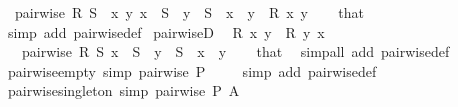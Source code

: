 \begin{isabellebody}
\ \ {\isachardoublequoteopen}pairwise\ R\ S{\isachardoublequoteclose}\ \ {\isachardoublequoteopen}{\isasymAnd}x\ y{\isachardot}{\kern0pt}\ x\ {\isasymin}\ S\ {\isasymLongrightarrow}\ y\ {\isasymin}\ S\ {\isasymLongrightarrow}\ x\ {\isasymnoteq}\ y\ {\isasymLongrightarrow}\ R\ x\ y{\isachardoublequoteclose}\isanewline
%
\isadelimproof
\ \ %
\endisadelimproof
%
\isatagproof
{}\isamarkupfalse%
\ that\ \isamarkupfalse%
\ {\isacharparenleft}{\kern0pt}simp\ add{\isacharcolon}{\kern0pt}\ pairwise{\isacharunderscore}{\kern0pt}def{\isacharparenright}{\kern0pt}%
\endisatagproof
{\isafoldproof}%
%
\isadelimproof
\isanewline
%
\endisadelimproof
\isanewline
{}\isamarkupfalse%
\ pairwiseD{\isacharcolon}{\kern0pt}\isanewline
\ \ {\isachardoublequoteopen}R\ x\ y{\isachardoublequoteclose}\ \ {\isachardoublequoteopen}R\ y\ x{\isachardoublequoteclose}\isanewline
\ \ \ {\isachardoublequoteopen}pairwise\ R\ S{\isachardoublequoteclose}\ {\isachardoublequoteopen}x\ {\isasymin}\ S{\isachardoublequoteclose}\ \ {\isachardoublequoteopen}y\ {\isasymin}\ S{\isachardoublequoteclose}\ \ {\isachardoublequoteopen}x\ {\isasymnoteq}\ y{\isachardoublequoteclose}\isanewline
%
\isadelimproof
\ \ %
\endisadelimproof
%
\isatagproof
{}\isamarkupfalse%
\ that\ \isamarkupfalse%
\ {\isacharparenleft}{\kern0pt}simp{\isacharunderscore}{\kern0pt}all\ add{\isacharcolon}{\kern0pt}\ pairwise{\isacharunderscore}{\kern0pt}def{\isacharparenright}{\kern0pt}%
\endisatagproof
{\isafoldproof}%
%
\isadelimproof
\isanewline
%
\endisadelimproof
\isanewline
{}\isamarkupfalse%
\ pairwise{\isacharunderscore}{\kern0pt}empty\ {\isacharbrackleft}{\kern0pt}simp{\isacharbrackright}{\kern0pt}{\isacharcolon}{\kern0pt}\ {\isachardoublequoteopen}pairwise\ P\ {\isacharbraceleft}{\kern0pt}{\isacharbraceright}{\kern0pt}{\isachardoublequoteclose}\isanewline
%
\isadelimproof
\ \ %
\endisadelimproof
%
\isatagproof
{}\isamarkupfalse%
\ {\isacharparenleft}{\kern0pt}simp\ add{\isacharcolon}{\kern0pt}\ pairwise{\isacharunderscore}{\kern0pt}def{\isacharparenright}{\kern0pt}%
\endisatagproof
{\isafoldproof}%
%
\isadelimproof
\isanewline
%
\endisadelimproof
\isanewline
{}\isamarkupfalse%
\ pairwise{\isacharunderscore}{\kern0pt}singleton\ {\isacharbrackleft}{\kern0pt}simp{\isacharbrackright}{\kern0pt}{\isacharcolon}{\kern0pt}\ {\isachardoublequoteopen}pairwise\ P\ {\isacharbraceleft}{\kern0pt}A{\isacharbraceright}{\kern0pt}{\isachardoublequoteclose}\isanewline

\end{isabellebody}
